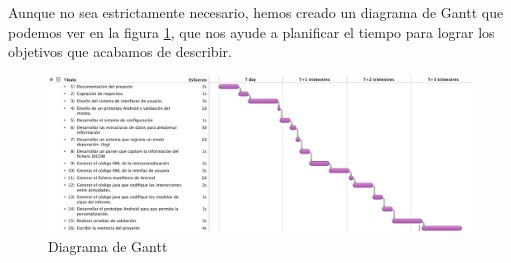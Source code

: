 \medskip\par
Aunque no sea estrictamente necesario, hemos creado un diagrama de Gantt que podemos ver en la figura \ref{fig:gantt}, que nos ayude a planificar el tiempo para lograr los objetivos que acabamos de describir.\par
\begin{figure}[ht]
\centering
\includegraphics[scale=0.3]{./imgs/gantt.pdf}
\caption{Diagrama de Gantt}
\label{fig:gantt}
\end{figure}
